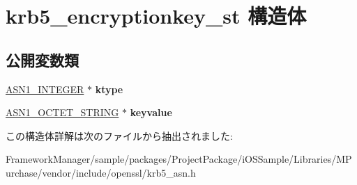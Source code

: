 \hypertarget{structkrb5__encryptionkey__st}{}\section{krb5\+\_\+encryptionkey\+\_\+st 構造体}
\label{structkrb5__encryptionkey__st}
\subsection*{公開変数類}
\begin{DoxyCompactItemize}
\item 
\hypertarget{structkrb5__encryptionkey__st_a883042268f43cbab262213ebbb7887a9}{}\hyperlink{structasn1__string__st}{A\+S\+N1\+\_\+\+I\+N\+T\+E\+G\+E\+R} $\ast$ {\bfseries ktype}\label{structkrb5__encryptionkey__st_a883042268f43cbab262213ebbb7887a9}

\item 
\hypertarget{structkrb5__encryptionkey__st_a6bed28f0b8e2345d51f976c57f0ec240}{}\hyperlink{structasn1__string__st}{A\+S\+N1\+\_\+\+O\+C\+T\+E\+T\+\_\+\+S\+T\+R\+I\+N\+G} $\ast$ {\bfseries keyvalue}\label{structkrb5__encryptionkey__st_a6bed28f0b8e2345d51f976c57f0ec240}

\end{DoxyCompactItemize}


この構造体詳解は次のファイルから抽出されました\+:\begin{DoxyCompactItemize}
\item 
Framework\+Manager/sample/packages/\+Project\+Package/i\+O\+S\+Sample/\+Libraries/\+M\+Purchase/vendor/include/openssl/krb5\+\_\+asn.\+h\end{DoxyCompactItemize}

